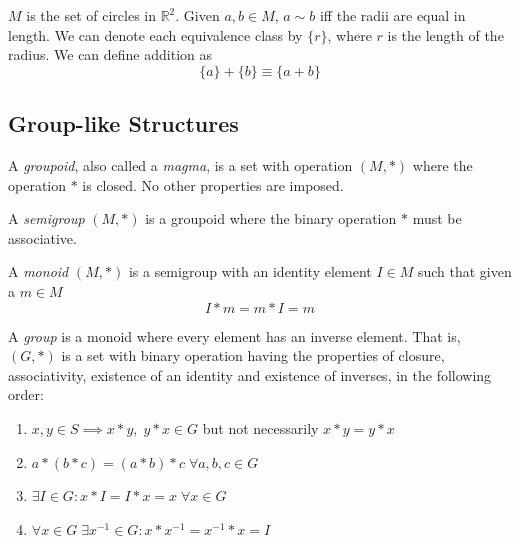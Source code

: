 \documentclass{article}
\begin{document}
    \begin{example}
      $M$ is the set of circles in $\mathbb{R}^{2}$. Given $a, b \in M$, $a \sim b$ iff the radii are equal in length. We can denote each equivalence class by $\{ r \}$, where $r$ is the length of the radius. We can define addition as 
      \begin{equation}
        \{ a \} + \{ b \} \equiv \{ a + b\}
      \end{equation}
    \end{example}

  \subsection{Group-like Structures}

    \begin{definition}
      A \textit{groupoid}, also called a \textit{magma}, is a set with operation $(M, *)$ where the operation $*$ is closed. No other properties are imposed. 
    \end{definition}

    \begin{definition}
      A \textit{semigroup} $(M, *)$ is a groupoid where the binary operation $*$ must be associative.  
    \end{definition}

    \begin{definition}
      A \textit{monoid} $(M, *)$ is a semigroup with an identity element $I \in M$ such that given a $m \in M$
      \begin{equation}
        I * m = m * I = m
      \end{equation}
    \end{definition}

    \begin{definition}
      A \textit{group} is a monoid where every element has an inverse element. That is, $(G, *)$ is a set with binary operation having the properties of closure, associativity, existence of an identity and existence of inverses, in the following order: 
      \begin{enumerate}
        \item $x, y \in S \implies x*y, \;y*x \in G$ but not necessarily $x*y  = y*x$
        \item $a*(b*c) = (a*b)*c \; \forall a, b, c \in G$
        \item $\exists I \in G : x*I = I*x = x \; \forall x \in G $
        \item $\forall x \in G \; \exists x^{-1} \in G : x * x^{-1} = x^{-1} * x = I$
      \end{enumerate}
    \end{definition}
\end{document}
